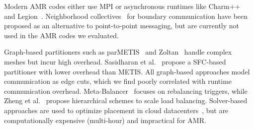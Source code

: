 \enlargethispage{\baselineskip}


Modern AMR codes either use MPI or asynchronous runtimes like Charm++~\cite{Acun2014:Charm++} and
Legion~\cite{Bauer2012:Legion}.
Neighborhood collectives~\cite{Hoefl2011:ScalableProcessTopology,
  Hoefl2012:OptimizationPrinciplesCollective,Ghazi:EfficientDesignsDistributed} for boundary
communication have been proposed as an alternative to point-to-point messaging, but are currently
not used in the AMR codes we evaluated.

Graph-based partitioners such as parMETIS~\cite{Lasal2013:parMETIS} and
Zoltan~\cite{Catal2007:Zoltan} handle complex meshes but incur high overhead.
Sasidharan et al.~\cite{Sasid2015:GeneralSpacefillingCurve} propose a SFC-based partitioner with
lower overhead than METIS.
All graph-based approaches model communication as edge cuts, which we find poorly correlated with
runtime communication overhead.
Meta-Balancer~\cite{Menon2012:MetaBalancer} focuses on rebalancing triggers, while Zheng et
al.~\cite{Zheng2011:PeriodicHierarchicalLoad} propose hierarchical schemes to scale load balancing.
Solver-based approaches are used to optimize placement in cloud datacenters~\cite{Newel2021:RAS},
but are computationally expensive (multi-hour) and impractical for AMR.




